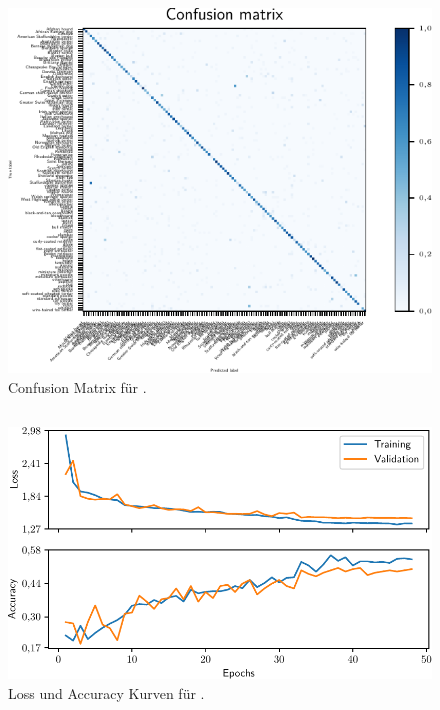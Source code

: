 \begin{figure}
  \centering
  \includegraphics[scale=0.8]{pics/ergebnisse/PreBigDogNN/confusion_matrix.pdf}
  \caption{Confusion Matrix für \PreBig{}.}
  \label{fig:confusion-prebig}
\end{figure}

\subsection{\MiniDog}

\begin{figure}
  \centering
  \includegraphics[scale=0.8]{pics/ergebnisse/MiniDogNN/history.pdf}
  \caption{Loss und Accuracy Kurven für \MiniDog{}.}
  \label{fig:loss-acc-minidog}
\end{figure}

